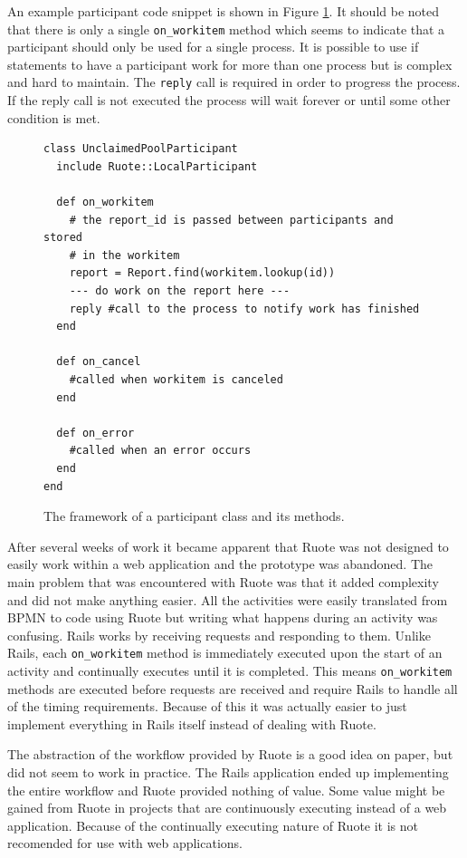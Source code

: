 \documentclass[document.tex]{subfiles}
\begin{document}
An example participant code snippet is shown in Figure \ref{fig:ruote-prototype-participant-code}. It should be noted that there is only a single \verb!on_workitem! method which seems to indicate that a participant should only be used for a single process. It is possible to use if statements to have a participant work for more than one process but is complex and hard to maintain. The \verb!reply! call is required in order to progress the process. If the reply call is not executed the process will wait forever or until some other condition is met.

\begin{figure}[!ht]
  \begin{lstlisting}
class UnclaimedPoolParticipant
  include Ruote::LocalParticipant

  def on_workitem
    # the report_id is passed between participants and stored
    # in the workitem
    report = Report.find(workitem.lookup(id))
    --- do work on the report here ---
    reply #call to the process to notify work has finished
  end

  def on_cancel
    #called when workitem is canceled
  end

  def on_error
    #called when an error occurs
  end
end
  \end{lstlisting}
  \caption{The framework of a participant class and its methods.}
  \label{fig:ruote-prototype-participant-code}
\end{figure}

After several weeks of work it became apparent that Ruote was not designed to easily work within a web application and the prototype was abandoned. The main problem that was encountered with Ruote was that it added complexity and did not make anything easier. All the activities were easily translated from BPMN to code using Ruote but writing what happens during an activity was confusing. Rails works by receiving requests and responding to them. Unlike Rails, each \verb!on_workitem! method is immediately executed upon the start of an activity and continually executes until it is completed. This means \verb!on_workitem! methods are executed before requests are received and require Rails to handle all of the timing requirements. Because of this it was actually easier to just implement everything in Rails itself instead of dealing with Ruote.

The abstraction of the workflow provided by Ruote is a good idea on paper, but did not seem to work in practice. The Rails application ended up implementing the entire workflow and Ruote provided nothing of value. Some value might be gained from Ruote in projects that are continuously executing instead of a web application. Because of the continually executing nature of Ruote it is not recomended for use with web applications.
\end{document}
